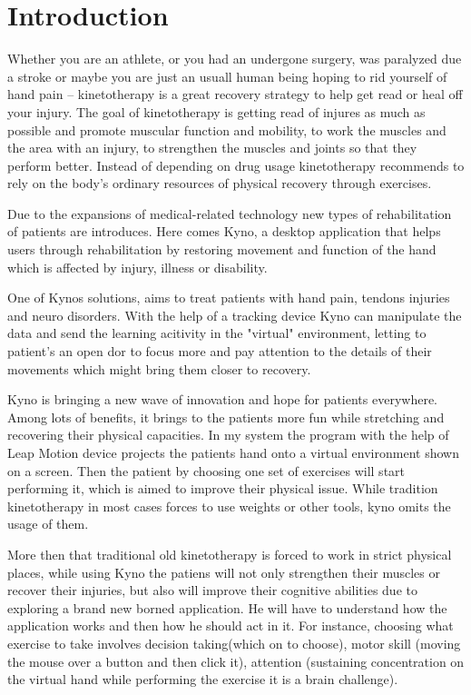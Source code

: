 \section*{Introduction}

Whether you are an athlete, or you had an undergone surgery, was paralyzed due a stroke or maybe you are just an usuall human being hoping to rid yourself of hand pain -- kinetotherapy is a great recovery strategy to help get read or heal off your injury. The goal of kinetotherapy is getting read of injures as much as possible and promote muscular function and mobility, to work the muscles and the area with an injury, to strengthen the muscles and joints so that they perform better.
Instead of depending on drug usage kinetotherapy recommends to rely on the body's ordinary resources of physical recovery through exercises.

Due to the expansions of medical-related technology new types of rehabilitation of patients are introduces. Here comes Kyno, a desktop application that helps users through rehabilitation by restoring movement and function of the hand which is affected by injury, illness or disability.

One of Kynos solutions, aims to treat patients with hand pain, tendons injuries and neuro disorders. With the help of a tracking device Kyno can manipulate the data and send the learning acitivity in the "virtual" environment, letting to patient's an open dor to focus more and pay attention to the details of their movements which might bring them closer to recovery.

Kyno is bringing a new wave of innovation and hope for patients everywhere. Among lots of benefits, it brings to the patients more fun while stretching and recovering their physical capacities. In my system the program with the help of Leap Motion device projects the patients hand onto a virtual environment shown on a screen. Then the patient by choosing one set of exercises will start performing it, which is aimed to improve their physical issue. While tradition kinetotherapy in most cases forces to use weights or other tools, kyno omits the usage of them. 

More then that traditional old kinetotherapy is forced to work in strict physical places, while using Kyno the patiens will not only strengthen their muscles or recover their injuries, but also will improve their cognitive abilities due to exploring a brand new borned application. He will have to understand how the application works and then how he should act in it. For instance, choosing what exercise to take involves decision taking(which on to choose), motor skill (moving the mouse over a button and then click it), attention (sustaining concentration on the virtual hand while performing the exercise it is a brain challenge). 

